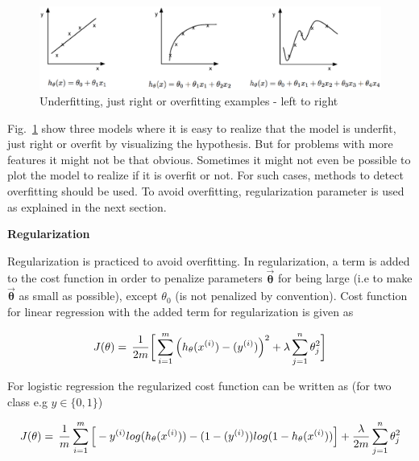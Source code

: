 \begin{figure}
\begin{center}
\includegraphics[width=16cm]{figures/underOverFit}    %
\caption{Underfitting, just right or overfitting examples - left to right} 
\label{fig:underOverFit}
\end{center}
\end{figure}

Fig.~\ref{fig:underOverFit} show three models where it is easy to realize that the model is underfit, just right or overfit by visualizing the hypothesis. 
But for problems with more features it might not be that obvious. Sometimes it might not even be possible to plot the model to realize if it is overfit or not.
For such cases, methods to detect overfitting should be used. 
To avoid overfitting, regularization parameter is used as explained in the next section.

\textbf{Regularization}

Regularization is practiced to avoid overfitting.
In regularization, a term is added to the cost function in order to penalize parameters $\vec{\bm{\theta}}$ for being large (i.e to make $\vec{\bm{\theta}}$ as small as possible), except ${\theta}_0$ (is not penalized by convention). Cost function for linear regression with the added term for regularization is given as

\begin{equation}{\label{eqn:costFuncRegularized}}
J(\theta)
=\,
\frac{1}{2m} \bigg[ \sum\limits_{i=1}^{m} \Big(h_\theta(x^{(i)}) - (y^{(i)})\Big)^2 +\lambda \sum\limits_{j=1}^{n} \theta_j^2 \bigg] 
\end{equation} 

For logistic regression the regularized cost function can be written as (for two class e.g $y \in \{0,1\}$)

\begin{equation}{\label{eqn:costFuncLogisticRegression}}
J(\theta)
=\,
\frac{1}{m} \sum\limits_{i=1}^{m} \Big[-y^{(i)}log(h_\theta(x^{(i)})) - (1-(y^{(i)}))log(1-h_\theta(x^{(i)}))\Big] +\frac{\lambda}{2m} \sum\limits_{j=1}^{n} \theta_j^2
\end{equation} 

